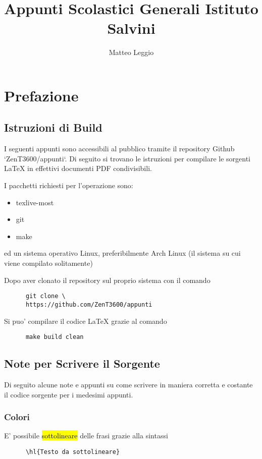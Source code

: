 \documentclass{article}
\begin{document}
  \title{\Huge Appunti Scolastici  Generali Istituto Salvini}
  \author{\Large Matteo Leggio}
  \date{}
  \maketitle

  \section{Prefazione}
  {
    \subsection{Istruzioni di Build}
    I seguenti appunti sono accessibili al pubblico tramite il repository Github `ZenT3600/appunti`. Di seguito si trovano le istruzioni per compilare le sorgenti LaTeX in effettivi documenti PDF condivisibili.

    I pacchetti richiesti per l'operazione sono:
    \begin{itemize}
      \item texlive-most
      \item git
      \item make
    \end{itemize}
    ed un sistema operativo Linux, preferibilmente Arch Linux (il sistema su cui viene compilato solitamente)

    Dopo aver clonato il repository sul proprio sistema con il comando
    \begin{verbatim}
      git clone \
      https://github.com/ZenT3600/appunti
    \end{verbatim}

    Si puo' compilare il codice LaTeX grazie al comando
    \begin{verbatim}
      make build clean
    \end{verbatim}

    \subsection{Note per Scrivere il Sorgente}
    Di seguito alcune note e appunti su come scrivere in maniera corretta e costante il codice sorgente per i medesimi appunti.

    \subsubsection{Colori}
    E' possibile \hl{sottolineare} delle frasi grazie alla sintassi
    \begin{verbatim}
      \hl{Testo da sottolineare}
    \end{verbatim}

}
\end{document}

